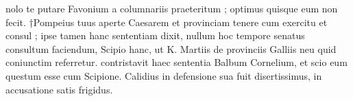  nolo te putare Favonium a columnariis praeteritum ; optimus quisque eum non fecit. †Pompeius tuus aperte Caesarem et provinciam tenere cum exercitu et consul ; ipse tamen hanc sententiam dixit, nullum hoc tempore senatus consultum faciendum, Scipio hanc, ut K. Martiis de provinciis Galliis neu quid coniunctim referretur. contristavit haec sententia Balbum Cornelium, et scio eum questum esse cum Scipione. Calidius in defensione sua fuit disertissimus, in accusatione satis frigidus.
